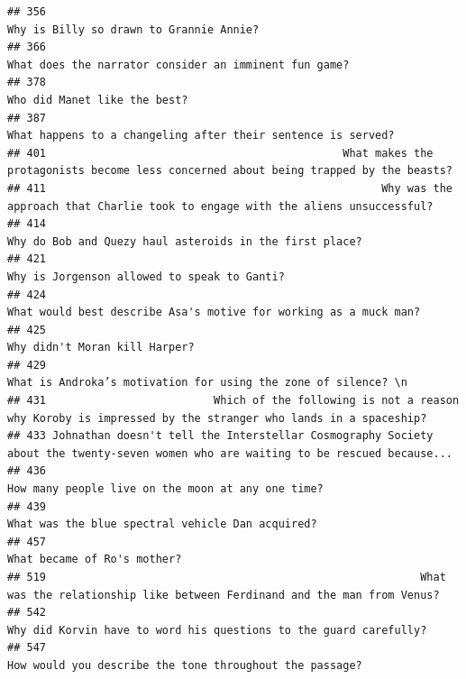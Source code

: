 \documentclass[
]{article}
\begin{document}
\begin{verbatim}
## 356                                                                                          Why is Billy so drawn to Grannie Annie? 
## 366                                                                             What does the narrator consider an imminent fun game?
## 378                                                                                                      Who did Manet like the best?
## 387                                                                      What happens to a changeling after their sentence is served?
## 401                                              What makes the protagonists become less concerned about being trapped by the beasts?
## 411                                                    Why was the approach that Charlie took to engage with the aliens unsuccessful?
## 414                                                                           Why do Bob and Quezy haul asteroids in the first place?
## 421                                                                                       Why is Jorgenson allowed to speak to Ganti?
## 424                                                                  What would best describe Asa's motive for working as a muck man?
## 425                                                                                                     Why didn't Moran kill Harper?
## 429                                                                    What is Androka’s motivation for using the zone of silence? \n
## 431                          Which of the following is not a reason why Koroby is impressed by the stranger who lands in a spaceship?
## 433 Johnathan doesn't tell the Interstellar Cosmography Society about the twenty-seven women who are waiting to be rescued because...
## 436                                                                                 How many people live on the moon at any one time?
## 439                                                                                  What was the blue spectral vehicle Dan acquired?
## 457                                                                                                       What became of Ro's mother?
## 519                                                          What was the relationship like between Ferdinand and the man from Venus?
## 542                                                                 Why did Korvin have to word his questions to the guard carefully?
## 547                                                                           How would you describe the tone throughout the passage?

\end{verbatim}
\end{document}
